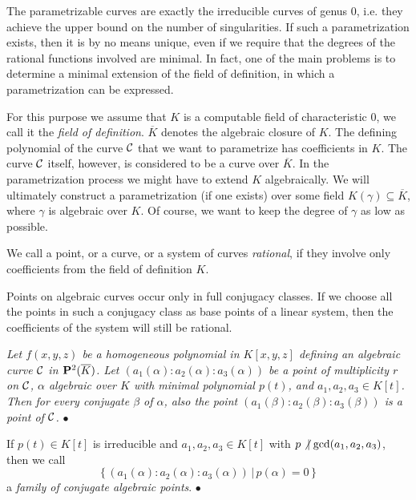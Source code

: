 The parametrizable curves are exactly the irreducible curves of
genus 0, i.e. they achieve the upper bound on the number of 
singularities.
If such a parametrization exists, then it
is by no means unique, even if we require that the degrees of the
rational functions involved are minimal. In fact, one of the main 
problems is to determine a minimal extension of the field of definition,
in which a parametrization can be expressed.

For this purpose we assume that $K$ is a computable field of
characteristic 0, we call it the {\it field of definition}.
$\overline K$ denotes the algebraic closure of $K$.
The defining polynomial of the curve $\cal C$ that we want to
parametrize has coefficients in $K$.
The curve $\cal C$ itself, however, is considered to be a curve
over $\overline K$.
In the parametrization process  we might have to
extend $K$ algebraically. We will ultimately construct a
parametrization (if one exists) over some field 
$K(\gamma) \subseteq \overline K$, where $\gamma$ is algebraic
over $K$.
Of course, we want to keep  the degree of $\gamma$ as low as possible.

We call a point, or a curve, or a system of curves {\it rational},
if they involve only coefficients from the field of definition $K$.


Points on algebraic curves occur only in full conjugacy  classes.
If we choose all the points in such a conjugacy class as 
base points of a linear system, then the coefficients of  the
system will still be rational.

\vspace{2 mm}

 {\sl Let $f(x,y,z)$ be a homogeneous
polynomial in $K[x,y,z]$ defining an algebraic curve $\cal C$
in ${\bf    P}^2(\overline K)$.
Let $(a_1(\alpha):a_2(\alpha):a_3(\alpha))$ be a point of
multiplicity $r$ on $\cal C$, $\alpha$ algebraic over $K$ with
minimal polynomial $p(t)$, and $a_1,a_2,a_3 \in K[t]$.
Then for every conjugate $\beta$ of $\alpha$, also the point
$(a_1(\beta):a_2(\beta):a_3(\beta))$ is a point of
$\cal C$.} \hfill$\bullet$

\vspace{2 mm}


If $p(t)\in K[t]$ is irreducible and $a_1,a_2,a_3 \in K[t]$ with
$p \not \hskip 0.1cm \mid   \gcd(a_1,a_2,a_3)$, then we call
$$\bigl\{\, (a_1(\alpha):a_2(\alpha):a_3(\alpha))\, |\,
                            p(\alpha)=0 \,\bigr\}$$
a {\it family of conjugate algebraic points}. 
\hfill$\bullet$


